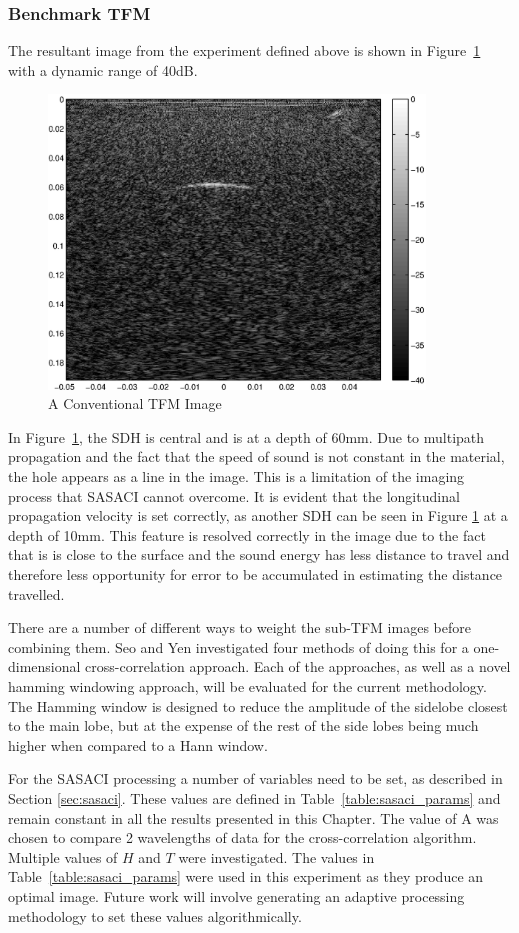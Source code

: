 \subsubsection{Benchmark TFM}
The resultant image from the experiment defined above is shown in Figure~\ref{fig:TFM} with a dynamic range of 40dB.
\begin{figure}[htbp]
\centering
		\includegraphics[width=100mm]{TFM.eps}
		\caption{A Conventional TFM Image}
		\label{fig:TFM}
\end{figure}
In Figure~\ref{fig:TFM}, the SDH is central and is at a depth of 60mm. Due to multipath propagation and the fact that the speed of sound is not constant in the material, the hole appears as a line in the image. This is a limitation of the imaging process that SASACI cannot overcome. It is evident that the longitudinal propagation velocity is set correctly, as another SDH can be seen in Figure \ref{fig:TFM} at a depth of 10mm. This feature is resolved correctly in the image due to the fact that is is close to the surface and the sound energy has less distance to travel and therefore less opportunity for error to be accumulated in estimating the distance travelled.

There are a number of different ways to weight the sub-TFM images before combining them. Seo and Yen\cite{seo_sidelobe_2008} investigated four methods of doing this for a one-dimensional cross-correlation approach. Each of the approaches, as well as a novel hamming windowing approach, will be evaluated for the current methodology. The Hamming window is designed to reduce the amplitude of the sidelobe closest to the main lobe, but at the expense of the rest of the side lobes being much higher when compared to a Hann window.

For the SASACI processing a number of variables need to be set, as described in Section \ref{sec:sasaci}. These values are defined in Table~\ref{table:sasaci_params} and remain constant in all the results presented in this Chapter. The value of A was chosen to compare 2 wavelengths of data for the cross-correlation algorithm. Multiple values of $H$ and $T$ were investigated. The values in Table~\ref{table:sasaci_params} were used in this experiment as they produce an optimal image. Future work will involve generating an adaptive processing methodology to set these values algorithmically.

